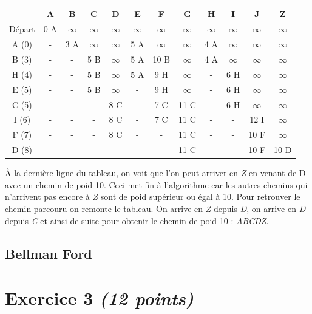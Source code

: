 \documentclass{article}
\begin{document}
\begin{tabular}{|c|c|c|c|c|c|c|c|c|c|c|c|}
	\hline
	& A & B & C & D & E & F & G & H & I & J & Z\\
	\hline
	Départ & 0 A & $\infty$ & $\infty$ & $\infty$ & $\infty$ & $\infty$ & $\infty$ & $\infty$ & $\infty$ & $\infty$ & $\infty$\\
	\hline 
	A (0) & - & 3 A & $\infty$ & $\infty$ & 5 A & $\infty$ & $\infty$ & 4 A & $\infty$ & $\infty$ & $\infty$\\
	\hline
	B (3) & - & - & 5 B & $\infty$ & 5 A & 10 B & $\infty$ & 4 A & $\infty$ & $\infty$ & $\infty$\\
	\hline
	H (4) & - & - & 5 B & $\infty$ & 5 A & 9 H & $\infty$ & - & 6 H & $\infty$ & $\infty$\\
	\hline
	E (5) & - & - & 5 B & $\infty$ & - & 9 H & $\infty$ & - & 6 H & $\infty$ & $\infty$\\
	\hline
	C (5) & - & - & - & 8 C & - & 7 C & 11 C & - & 6 H & $\infty$ & $\infty$\\
	\hline
	I (6) & - & - & - & 8 C & - & 7 C & 11 C & - & - & 12 I & $\infty$\\
	\hline
	F (7) & - & - & - & 8 C & - & - & 11 C & - & - & 10 F & $\infty$\\
	\hline
	D (8) & - & - & - & - & - & - & 11 C & - & - & 10 F & 10 D\\
	\hline
\end{tabular}

\hfill

\hfill

À la dernière ligne du tableau, on voit que l'on peut arriver en \emph{Z} en venant de D avec un chemin de poid 10. Ceci met fin à l'algorithme car les autres chemins qui n'arrivent pas encore à \emph{Z} sont de poid supérieur ou égal à 10. Pour retrouver le chemin parcouru on remonte le tableau. On arrive en \emph{Z} depuis \emph{D}, on arrive en \emph{D} depuis \emph{C} et ainsi de suite pour obtenir le chemin  de poid 10 : \emph{ABCDZ}.

\subsection{Bellman Ford}



\clearpage

\section{Exercice 3 \emph{(12 points)}}
\end{document}
